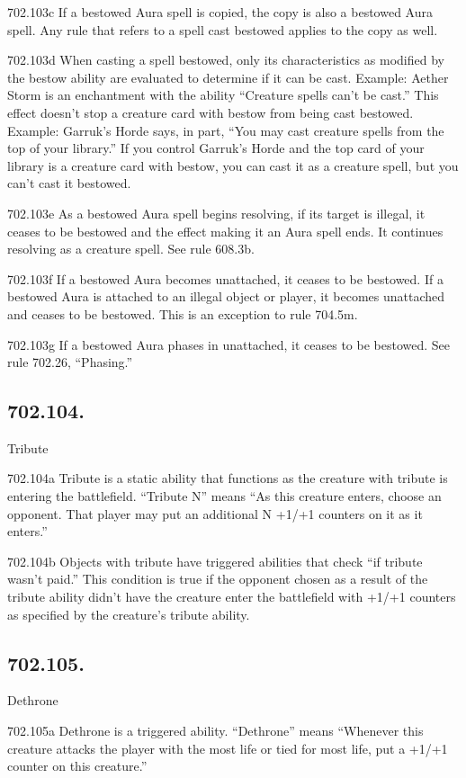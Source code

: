 702.103c If a bestowed Aura spell is copied, the copy is also a bestowed Aura spell. Any rule that refers to a spell cast bestowed applies to the copy as well.

702.103d When casting a spell bestowed, only its characteristics as modified by the bestow ability are evaluated to determine if it can be cast.
Example: Aether Storm is an enchantment with the ability “Creature spells can’t be cast.” This effect doesn’t stop a creature card with bestow from being cast bestowed.
Example: Garruk’s Horde says, in part, “You may cast creature spells from the top of your library.” If you control Garruk’s Horde and the top card of your library is a creature card with bestow, you can cast it as a creature spell, but you can’t cast it bestowed.

702.103e As a bestowed Aura spell begins resolving, if its target is illegal, it ceases to be bestowed and the effect making it an Aura spell ends. It continues resolving as a creature spell. See rule 608.3b.

702.103f If a bestowed Aura becomes unattached, it ceases to be bestowed. If a bestowed Aura is attached to an illegal object or player, it becomes unattached and ceases to be bestowed. This is an exception to rule 704.5m.

702.103g If a bestowed Aura phases in unattached, it ceases to be bestowed. See rule 702.26, “Phasing.”

\subsection*{702.104.}
Tribute

702.104a Tribute is a static ability that functions as the creature with tribute is entering the battlefield. “Tribute N” means “As this creature enters, choose an opponent. That player may put an additional N +1/+1 counters on it as it enters.”

702.104b Objects with tribute have triggered abilities that check “if tribute wasn’t paid.” This condition is true if the opponent chosen as a result of the tribute ability didn’t have the creature enter the battlefield with +1/+1 counters as specified by the creature’s tribute ability.

\subsection*{702.105.}
Dethrone

702.105a Dethrone is a triggered ability. “Dethrone” means “Whenever this creature attacks the player with the most life or tied for most life, put a +1/+1 counter on this creature.”

